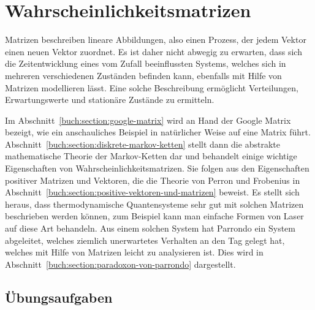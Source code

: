 %
%
%
\chapter{Wahrscheinlichkeitsmatrizen
\label{buch:chapter:wahrscheinlichkeit}}
\rhead{}
Matrizen beschreiben lineare Abbildungen, also einen Prozess, der
jedem Vektor einen neuen Vektor zuordnet.
Es ist daher nicht abwegig zu erwarten, dass sich 
die Zeitentwicklung eines vom Zufall beeinflussten Systems, welches sich
in mehreren verschiedenen Zuständen befinden kann, ebenfalls mit Hilfe
von Matrizen modellieren lässt.
Eine solche Beschreibung ermöglicht Verteilungen,
Erwartungswerte und stationäre Zustände zu ermitteln.

Im Abschnitt~\ref{buch:section:google-matrix} wird an Hand der Google
Matrix bezeigt, wie ein anschauliches Beispiel in natürlicher Weise
auf eine Matrix führt.
Abschnitt~\ref{buch:section:diskrete-markov-ketten} stellt dann die abstrakte
mathematische Theorie der Markov-Ketten dar und behandelt einige wichtige
Eigenschaften von Wahrscheinlichkeitsmatrizen.
Sie folgen aus den Eigenschaften positiver Matrizen und Vektoren, 
die die Theorie von Perron und Frobenius in
Abschnitt~\ref{buch:section:positive-vektoren-und-matrizen}
beweist.
Es stellt sich heraus, dass thermodynamische Quantensysteme sehr gut
mit solchen Matrizen beschrieben werden können, zum Beispiel kann man
einfache Formen von Laser auf diese Art behandeln.
Aus einem solchen System hat Parrondo ein System abgeleitet, welches 
ziemlich unerwartetes Verhalten an den Tag gelegt hat, welches mit
Hilfe von Matrizen leicht zu analysieren ist. 
Dies wird in Abschnitt~\ref{buch:section:paradoxon-von-parrondo}
dargestellt.






\section*{Übungsaufgaben}
\begin{uebungsaufgaben}
\end{uebungsaufgaben}

